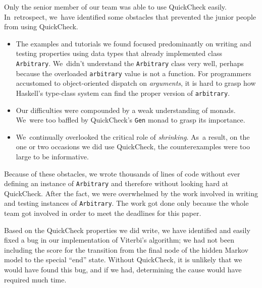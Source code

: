 \documentclass[preprint,nonatbib,blockstyle,times]{sigplanconf}
\begin{document}
Only the senior member of our team was able to use
QuickCheck easily.
In~retrospect, we~have identified some obstacles that prevented the
junior people from using
QuickCheck.
\begin{itemize}
\item
The examples and tutorials we found focused 
predominantly on writing and testing properties using data types that
already implemented class \texttt{Arbitrary}.
We~didn't understand the \texttt{Arbitrary} class very well, 
perhaps because the overloaded \texttt{arbitrary} value is not a
function.
For programmers accustomed to object-oriented dispatch
on \emph{arguments}, it is hard to grasp how Haskell's type-class
system can find the proper version
of \texttt{arbitrary}.
\item
Our difficulties were compounded by a weak understanding of monads.
We~were too baffled by QuickCheck's \texttt{Gen} monad to grasp its
importance.
\item
We~continually overlooked the critical role of \emph{shrinking}.
As~a result, on the one or two occasions we did 
use QuickCheck, the counterexamples were too large to be
informative. 
\end{itemize}
Because of these obstacles, 
we wrote thousands of lines of code without ever defining an instance
of \texttt{Arbitrary} and therefore
without looking hard at QuickCheck.
After the fact, we were overwhelmed by the work
involved in writing and testing instances
of
\texttt{Arbitrary}.
The work got done only because the whole team got involved in order to
meet the deadlines for this paper.

Based on the QuickCheck properties we did write, we have identified and
easily fixed a bug in our implementation of Viterbi's algorithm; we had not
been including the score for the transition from the final node of the hidden
Markov model to the special ``end'' state.
Without QuickCheck, it is unlikely that we would have found this bug,
and if we had, determining the cause would have required much time.

\end{document}
